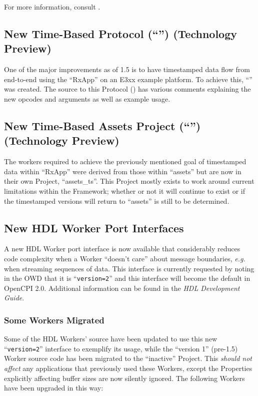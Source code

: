 For more information, consult .
\subsection{New Time-Based Protocol (``'') (Technology Preview)} %
\label{sec:15_protocol}
One of the major improvements as of 1.5 is to have timestamped data flow from end-to-end using the ``RxApp'' on an E3xx example platform. To achieve this, ``'' was created. The source to this Protocol () has various comments explaining the new opcodes and arguments as well as example usage.
\subsection{New Time-Based Assets Project (``'') (Technology Preview)} %
\label{sec:15_assets_ts}
The workers required to achieve the previously mentioned goal of timestamped data within ``RxApp'' were derived from those within ``assets'' but are now in their own Project, ``assets\_ts''. This Project mostly exists to work around current limitations within the Framework; whether or not it will continue to exist or if the timestamped versions will return to ``assets'' is still to be determined.

\subsection{New HDL Worker Port Interfaces} %
\label{sec:15_smart_wrappers}
A new HDL Worker port interface is now available that considerably reduces code complexity when a Worker ``doesn't care'' about message boundaries, \textit{e.g.} when streaming sequences of data. This interface is currently requested by noting in the OWD that it is ``\texttt{version=2}'' and this interface will become the default in OpenCPI 2.0. Additional information can be found in the \textit{HDL Development Guide}.

\subsubsection*{Some Workers Migrated} %
\label{sec:15_v2_workers}
Some of the HDL Workers' source have been updated to use this new ``\texttt{version=2}'' interface to exemplify its usage, while the ``version 1'' (pre-1.5) Worker source code has been migrated to the ``inactive'' Project.
This \textit{should not affect} any applications that previously used these Workers, except the Properties explicitly affecting buffer sizes are now silently ignored.
The following Workers have been upgraded in this way:

